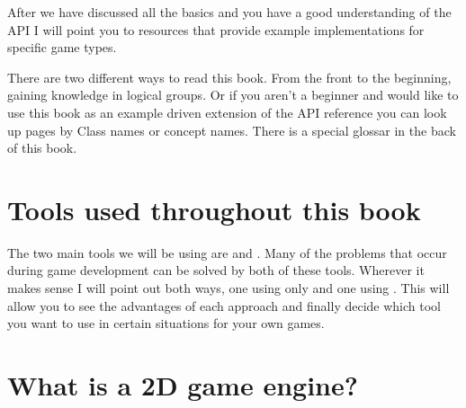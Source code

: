 After we have discussed all the basics and you have a good understanding of the
\cocos{} API I will point you to resources that provide example implementations
for specific game types.

There are two different ways to read this book. From the front to the beginning,
gaining knowledge in logical groups. Or if you aren't a beginner and would like
to use this book as an example driven extension of the API reference you can
look up pages by Class names or concept names. There is a special glossar in the
back of this book.

\section{Tools used throughout this book}
The two main tools we will be using are \cocos{} and \spriteb{}. Many of the
problems that occur during game development can be solved by both of these
tools. Wherever it makes sense I will point out both ways, one using only
\cocos{} and one using \spriteb{}. This will allow you to see the advantages of each approach
and finally decide which tool you want to use in certain situations for your own
games.

\section{What is a 2D game engine?}
